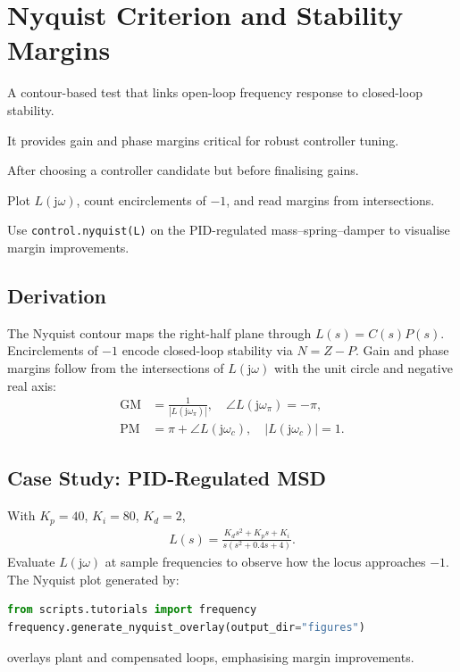 \section{Nyquist Criterion and Stability Margins}
\begin{beginnerguide}
    \item[\textbf{What?}] A contour-based test that links open-loop frequency response to closed-loop stability.
    \item[\textbf{Why?}] It provides gain and phase margins critical for robust controller tuning.
    \item[\textbf{When?}] After choosing a controller candidate but before finalising gains.
    \item[\textbf{How?}] Plot $L(\mathrm{j}\omega)$, count encirclements of $-1$, and read margins from intersections.
    \item[\textbf{Example}] Use \texttt{control.nyquist(L)} on the PID-regulated mass--spring--damper to visualise margin improvements.
\end{beginnerguide}
\subsection{Derivation}
The Nyquist contour maps the right-half plane through $L(s) = C(s) P(s)$. Encirclements of $-1$ encode closed-loop stability via $N = Z - P$. Gain and phase margins follow from the intersections of $L(\mathrm{j}\omega)$ with the unit circle and negative real axis:
\begin{align*}
    \text{GM} &= \frac{1}{|L(\mathrm{j}\omega_\pi)|}, \quad \angle L(\mathrm{j}\omega_\pi) = -\pi,\\
    \text{PM} &= \pi + \angle L(\mathrm{j}\omega_c), \quad |L(\mathrm{j}\omega_c)| = 1.
\end{align*}

\subsection{Case Study: PID-Regulated MSD}
With $K_p = 40$, $K_i = 80$, $K_d = 2$,
\begin{align*}
    L(s) = \frac{K_d s^2 + K_p s + K_i}{s (s^2 + 0.4 s + 4)}.
\end{align*}
Evaluate $L(\mathrm{j}\omega)$ at sample frequencies to observe how the locus approaches $-1$. The Nyquist plot generated by:
\begin{lstlisting}[language=python]
from scripts.tutorials import frequency
frequency.generate_nyquist_overlay(output_dir="figures")
\end{lstlisting}
overlays plant and compensated loops, emphasising margin improvements.

